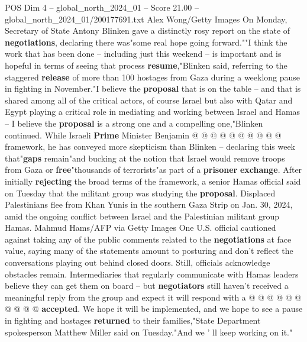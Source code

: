 \begin{textsample}{POS Dim 4 – global\_north\_2024\_01 – Score 21.00 – global\_north\_2024\_01/200177691.txt}
Alex Wong/Getty Images On Monday, Secretary of State Antony Blinken gave a distinctly rosy report on the state of \textbf{negotiations}, declaring there was"some real hope going forward.""I think the work that has been done -- including just this weekend -- is important and is hopeful in terms of seeing that process \textbf{resume},"Blinken said, referring to the staggered \textbf{release} of more than 100 hostages from Gaza during a weeklong pause in fighting in November."I believe the \textbf{proposal} that is on the table -- and that is shared among all of the critical actors, of course Israel but also with Qatar and Egypt playing a critical role in mediating and working between Israel and Hamas -- I believe the \textbf{proposal} is a strong one and a compelling one,"Blinken continued.
While Israeli \textbf{Prime} Minister Benjamin @ @ @ @ @ @ @ @ @ @ framework, he has conveyed more skepticism than Blinken -- declaring this week that"\textbf{gaps} remain"and bucking at the notion that Israel would remove troops from Gaza or \textbf{free}"thousands of terrorists"as part of a \textbf{prisoner} \textbf{exchange}.
After initially \textbf{rejecting} the broad terms of the framework, a senior Hamas official said on Tuesday that the militant group was studying the \textbf{proposal}.
Displaced Palestinians flee from Khan Yunis in the southern Gaza Strip on Jan. 30, 2024, amid the ongoing conflict between Israel and the Palestinian militant group Hamas.
Mahmud Hams/AFP via Getty Images One U.S. official cautioned against taking any of the public comments related to the \textbf{negotiations} at face value, saying many of the statements amount to posturing and don't reflect the conversations playing out behind closed doors.
Still, officials acknowledge obstacles remain.
Intermediaries that regularly communicate with Hamas leaders believe they can get them on board -- but \textbf{negotiators} still haven't received a meaningful reply from the group and expect it will respond with a @ @ @ @ @ @ @ @ @ @ \textbf{accepted}.
We hope it will be implemented, and we hope to see a pause in fighting and hostages \textbf{returned} to their families,"State Department spokesperson Matthew Miller said on Tuesday."And we ' ll keep working on it."

\end{textsample}
